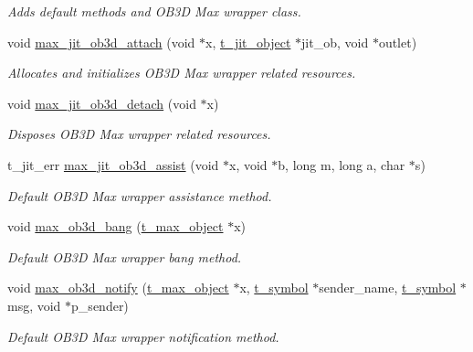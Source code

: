 \begin{DoxyCompactItemize}
\begin{DoxyCompactList}\small\item\em Adds default methods and OB3D Max wrapper class. \item\end{DoxyCompactList}\item 
void \hyperlink{group__ob3dmod_ga00933af2acf7bd26e6480c6e234faecd}{max\_\-jit\_\-ob3d\_\-attach} (void $\ast$x, \hyperlink{structt__object}{t\_\-jit\_\-object} $\ast$jit\_\-ob, void $\ast$outlet)
\begin{DoxyCompactList}\small\item\em Allocates and initializes OB3D Max wrapper related resources. \item\end{DoxyCompactList}\item 
void \hyperlink{group__ob3dmod_ga2a6c8c09bfdbaff867e61ac74fa08a7d}{max\_\-jit\_\-ob3d\_\-detach} (void $\ast$x)
\begin{DoxyCompactList}\small\item\em Disposes OB3D Max wrapper related resources. \item\end{DoxyCompactList}\item 
t\_\-jit\_\-err \hyperlink{group__ob3dmod_ga8fa7e82f9a1f64c2e5d10b2dbf340536}{max\_\-jit\_\-ob3d\_\-assist} (void $\ast$x, void $\ast$b, long m, long a, char $\ast$s)
\begin{DoxyCompactList}\small\item\em Default OB3D Max wrapper assistance method. \item\end{DoxyCompactList}\item 
void \hyperlink{group__ob3dmod_ga28495cb4eb40093b45f576c6ddf41ff6}{max\_\-ob3d\_\-bang} (\hyperlink{structt__object}{t\_\-max\_\-object} $\ast$x)
\begin{DoxyCompactList}\small\item\em Default OB3D Max wrapper bang method. \item\end{DoxyCompactList}\item 
void \hyperlink{group__ob3dmod_ga2060791191cae96371aeae6090d1f215}{max\_\-ob3d\_\-notify} (\hyperlink{structt__object}{t\_\-max\_\-object} $\ast$x, \hyperlink{structt__symbol}{t\_\-symbol} $\ast$sender\_\-name, \hyperlink{structt__symbol}{t\_\-symbol} $\ast$msg, void $\ast$p\_\-sender)
\begin{DoxyCompactList}\small\item\em Default OB3D Max wrapper notification method. \item\end{DoxyCompactList}\item 

\end{DoxyCompactItemize}
